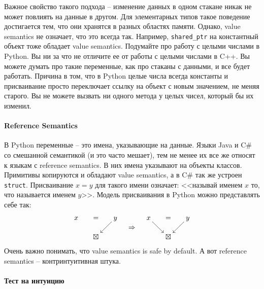 Важное свойство такого подхода -- изменение данных в одном стакане никак не может повлиять на данные в другом.
Для элементарных типов такое поведение достигается тем, что они хранятся в разных областях памяти.
Однако, value semantics не означает, что это всегда так.
Например, \verb"shared_ptr" на константный объект тоже обладает value semantics.
Подумайте про работу с целыми числами в Python.
Вы ни за что не отличите ее от работы с целыми числами в C++.
Вы можете думать про такие переменные, как про стаканы с данными, и все будет работать.
Причина в том, что в Python целые числа всегда константы и присваивание просто переключает ссылку на объект с новым значением, не меняя старого.
Вы не можете вызвать ни одного метода у целых чисел, который бы их изменил.

\paragraph{Reference Semantics}

В Python переменные -- это имена, указывающие на данные.
Языки Java и C\# со смешанной семантикой (и это часто мешает), тем не менее их все же относят к языкам с reference semantics.
В них имена указывают на объекты классов. Примитивы копируются и обладают value semantics, а в C\# так же устроен \verb"struct".
Присваивание $x = y$ для такого имени означает: <<называй именем $x$ то, что называется именем $y$>>.
Модель присваивания в Python можно представлять себе так: 
\[
\begin{aligned}
\xymatrix@R=15pt@C=15pt{
{x}&{=}&{y}\ar[dl]\\
{}&{\boxtimes}&{}
}
\end{aligned}
\quad\Rightarrow\quad
\begin{aligned}
\xymatrix@R=15pt@C=15pt{
{x}\ar[dr]&{=}&{y}\ar[dl]\\
{}&{\boxtimes}&{}
}
\end{aligned}
\]
Очень важно понимать, что value semantics is safe by default.
А вот reference semantics -- контринтуитивная штука.

\paragraph{Тест на интуицию}

